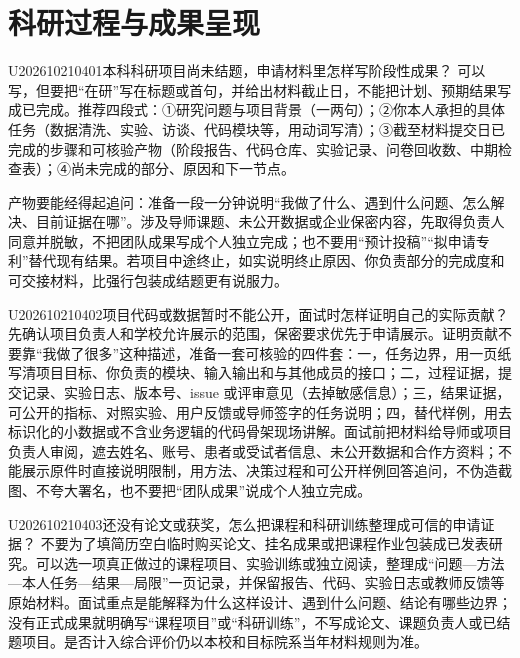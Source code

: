 
\section{科研过程与成果呈现}
\begin{qa}{U202610210401}{本科科研项目尚未结题，申请材料里怎样写阶段性成果？}
可以写，但要把“在研”写在标题或首句，并给出材料截止日，不能把计划、预期结果写成已完成。推荐四段式：①研究问题与项目背景（一两句）；②你本人承担的具体任务（数据清洗、实验、访谈、代码模块等，用动词写清）；③截至材料提交日已完成的步骤和可核验产物（阶段报告、代码仓库、实验记录、问卷回收数、中期检查表）；④尚未完成的部分、原因和下一节点。

产物要能经得起追问：准备一段一分钟说明“我做了什么、遇到什么问题、怎么解决、目前证据在哪”。涉及导师课题、未公开数据或企业保密内容，先取得负责人同意并脱敏，不把团队成果写成个人独立完成；也不要用“预计投稿”“拟申请专利”替代现有结果。若项目中途终止，如实说明终止原因、你负责部分的完成度和可交接材料，比强行包装成结题更有说服力。
\end{qa}
\begin{qa}{U202610210402}{项目代码或数据暂时不能公开，面试时怎样证明自己的实际贡献？}
先确认项目负责人和学校允许展示的范围，保密要求优先于申请展示。证明贡献不要靠“我做了很多”这种描述，准备一套可核验的四件套：一，任务边界，用一页纸写清项目目标、你负责的模块、输入输出和与其他成员的接口；二，过程证据，提交记录、实验日志、版本号、issue 或评审意见（去掉敏感信息）；三，结果证据，可公开的指标、对照实验、用户反馈或导师签字的任务说明；四，替代样例，用去标识化的小数据或不含业务逻辑的代码骨架现场讲解。面试前把材料给导师或项目负责人审阅，遮去姓名、账号、患者或受试者信息、未公开数据和合作方资料；不能展示原件时直接说明限制，用方法、决策过程和可公开样例回答追问，不伪造截图、不夸大署名，也不要把“团队成果”说成个人独立完成。
\end{qa}
\begin{qa}{U202610210403}{还没有论文或获奖，怎么把课程和科研训练整理成可信的申请证据？}
不要为了填简历空白临时购买论文、挂名成果或把课程作业包装成已发表研究。可以选一项真正做过的课程项目、实验训练或独立阅读，整理成“问题—方法—本人任务—结果—局限”一页记录，并保留报告、代码、实验日志或教师反馈等原始材料。面试重点是能解释为什么这样设计、遇到什么问题、结论有哪些边界；没有正式成果就明确写“课程项目”或“科研训练”，不写成论文、课题负责人或已结题项目。是否计入综合评价仍以本校和目标院系当年材料规则为准。
\end{qa}
